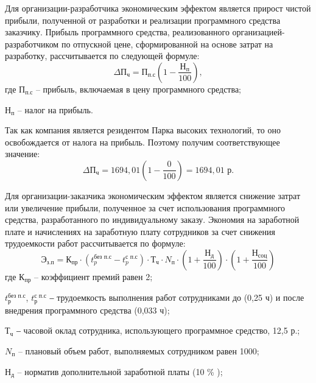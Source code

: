 Для организации-разработчика экономическим эффектом является прирост чистой прибыли, полученной от разработки и реализации программного средства заказчику.
Прибыль программного средства, реализованного организацией-разработчиком по отпускной цене, сформированной на основе затрат на разработку, рассчитывается по следующей формуле:
\begin{equation}
	\label{eq:clean_profit}   
	\Delta 	\mathrm{П_{ч}} = \mathrm{П_{п.с}} \left( 1 - \frac{	\mathrm{Н_{п}}}{100} \right),
\end{equation}
где $\text{П}_{\text{п.с}}$ – прибыль, включаемая в цену программного средства;

\hspace{-0.9em}$\text{Н}_{\text{п}}$ – налог на прибыль.
 
 Так как компания является резидентом Парка высоких технологий, то оно освобождается от налога на прибыль. Поэтому получим соответствующее значение:
\[
\Delta \mathrm{П_{ч}} = 1694{,}01 \left(1 - \frac{0}{100}\right) = 1694{,}01 \text{ р}.
\]

Для организации-заказчика экономическим эффектом является снижение затрат или увеличение прибыли, полученное за счет использования программного средства, разработанного по индивидуальному заказу. Экономия на заработной плате и начислениях на заработную плату сотрудников за счет снижения трудоемкости работ рассчитывается по формуле:
\begin{equation}
	\label{eq:savings_salary}
	\mathrm{Э_{з.п}} = \mathrm{К_{пр}} \cdot (t_p^{\text{без п.с}} - t_p^{\text{с п.с}}) \cdot \mathrm{Т_{ч}} \cdot N_{\text{п}} \cdot \left(1 + \frac{\mathrm{Н_{д}}}{100}\right) \cdot \left(1 + \frac{\mathrm{Н_{соц}}}{100}\right)
\end{equation}
где $\mathrm{К_{пр}}$ – коэффициент премий равен 2;

\hspace{-0.9em}$t_\text{р}^{\text{без п.с}}$, $t_\text{р}^{\text{с п.с}}$ ‒ трудоемкость выполнения работ сотрудниками до (0,25 ч) и после внедрения программного средства (0,033 ч);

\hspace{-0.9em}$\text{Т}_{\text{ч}}$ ‒ часовой оклад сотрудника, использующего программное средство, 12,5 р.;

\hspace{-0.9em}$N_{\text{п}}$ – плановый объем работ, выполняемых сотрудником равен 1000;

\hspace{-0.9em}$\mathrm{Н_{д}}$ – норматив дополнительной заработной платы (10 \% );

